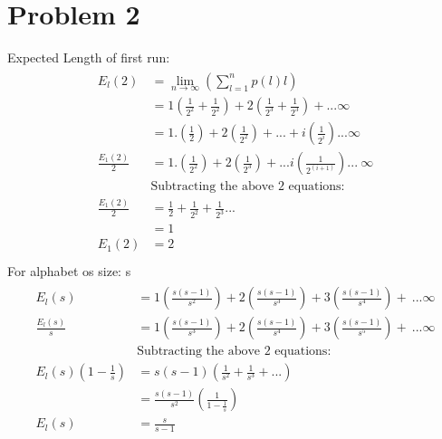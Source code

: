 \documentclass[paper=a4, fontsize=11pt]{scrartcl} %
\numberwithin{equation}{section} %
\numberwithin{figure}{section} %
\numberwithin{table}{section} %
\begin{document}
\section{Problem 2}
Expected Length of first run: 
\begin{align*}
\begin{split}
	E_l(2) 	&= \lim_{n\rightarrow \infty}\left(\sum_{l=1}^{n}p(l)l\right)\\
			&= 1\left(\frac{1}{2^2} + \frac{1}{2^2}\right) + 
	2\left(\frac{1}{2^3} + \frac{1}{2^3}\right) + ... \infty\\
			&= 1.\left(\frac{1}{2}\right) + 2\left(\frac{1}{2^2}\right)+... + i\left(\frac{1}{2^i}\right)...\infty\\
	\frac{E_1(2)}{2} &= 1.\left(\frac{1}{2^2}\right) + 2\left(\frac{1}{2^3}\right)+... i\left(\frac{1}{2^{(i+1)}}\right)...\ \infty\\
	&\text{Subtracting the above 2 equations:}\\
	\frac{E_1(2)}{2} &= \frac{1}{2} + \frac{1}{2^2} + \frac{1}{2^3}...\\
	&= 1\\
	E_1(2) &= 2\\
\end{split}
\end{align*}
For alphabet os size: s\\
\begin{align*}
\begin{split}
E_l(s) &= 1\left(\frac{s(s-1)}{s^2}\right) + 2\left(\frac{s(s-1)}{s^3}\right) + 3\left(\frac{s(s-1)}{s^4}\right) +\ ... \infty\\
\frac{E_l(s)}{s} &= 1\left(\frac{s(s-1)}{s^3}\right) + 2\left(\frac{s(s-1)}{s^4}\right) + 3\left(\frac{s(s-1)}{s^5}\right) +\ ... \infty\\
&\text{Subtracting the above 2 equations:}\\
E_l(s)\left(1-\frac{1}{s}\right) &= s(s-1)\left(\frac{1}{s^2} + \frac{1}{s^3} + ...\right)\\
&= \frac{s(s-1)}{s^2}\left(\frac{1}{1-\frac{1}{s}}\right)\\
E_l(s) &= \frac{s}{s-1}\\\
\end{split}
\end{align*}
\end{document}
